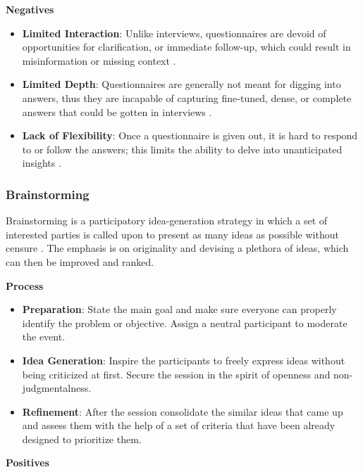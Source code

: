\documentclass[conference]{IEEEtran}
\begin{document}
\textbf{Negatives}

\begin{itemize}
    \item \textbf{Limited Interaction}: Unlike interviews, questionnaires are devoid of opportunities for clarification, or immediate follow-up, which could result in misinformation or missing context \cite{cite10}.
    \item \textbf{Limited Depth}: Questionnaires are generally not meant for digging into answers, thus they are incapable of capturing fine-tuned, dense, or complete answers that could be gotten in interviews \cite{cite10}.
    \item \textbf{Lack of Flexibility}: Once a questionnaire is given out, it is hard to respond to or follow the answers; this limits the ability to delve into unanticipated insights \cite{cite9}.
\end{itemize}

\subsubsection{Brainstorming}

Brainstorming is a participatory idea-generation strategy in which a set of interested parties is called upon to present as many ideas as possible without censure \cite{cite11}. The emphasis is on originality and devising a plethora of ideas, which can then be improved and ranked.

\textbf{Process}

\begin{itemize}
    \item \textbf{Preparation}: State the main goal and make sure everyone can properly identify the problem or objective. Assign a neutral participant to moderate the event.
    \item \textbf{Idea Generation}: Inspire the participants to freely express ideas without being criticized at first. Secure the session in the spirit of openness and non-judgmentalness.
    \item \textbf{Refinement}: After the session consolidate the similar ideas that came up and assess them with the help of a set of criteria that have been already designed to prioritize them.
\end{itemize}

\textbf{Positives}
\end{document}
